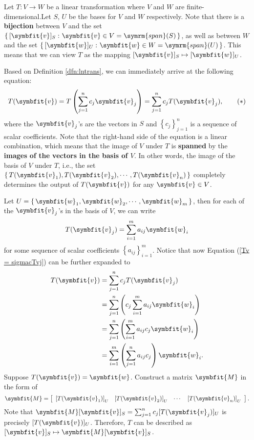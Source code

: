 \documentclass[math]{amznotes}
\theoremstyle{remark}
\begin{document}
Let $T \colon V \rightarrow W$ be a linear transformation where $V$ and $W$ are finite-dimensional.Let $S$, $U$ be the bases for $V$ and $W$ respectively. Note that there is a {\color{red} \textbf{bijection}} between $V$ and the set $\left\{ \, [\symbfit{v}]_S \,\colon \symbfit{v} \in V = \symrm{span}(S) \, \right\}$, as well as between $W$ and the set $\left\{ \, [\symbfit{w}]_U \,\colon \symbfit{w} \in W = \symrm{span}(U) \, \right\}$. This means that we can view $T$ as the mapping $[\symbfit{v}]_S \mapsto [\symbfit{w}]_U$. 

Based on Definition \ref{dfn:lntrans}, we can immediately arrive at the following equation:
\begin{displaymath}
    T(\symbfit{v}) = T\left(\sum_{j = 1}^{n}c_j \symbfit{v}_j\right) = \sum_{j = 1}^{n}c_jT(\symbfit{v}_j), \label{Tv = sigmacTvj} \tag{$*$}
\end{displaymath}
where the $\symbfit{v}_j$'s are the vectors in $S$ and $\left\{ c_j \right\}_{j = 1}^n$ is a sequence of scalar coefficients. Note that the right-hand side of the equation is a linear combination, which means that the image of $V$ under $T$ is {\color{red} \textbf{spanned}} by the {\color{red} \textbf{images of the vectors in the basis of $V$}}. In other words, the image of the basis of $V$ under $T$, i.e., the set $\left\{\, T(\symbfit{v}_1), T(\symbfit{v}_2), \cdots, T(\symbfit{v}_n) \,\right\}$ completely determines the output of $T(\symbfit{v})$ for any $\symbfit{v} \in V$.

Let $U = \left\{ \, \symbfit{w}_1, \symbfit{w}_2, \cdots, \symbfit{w}_m \, \right\}$, then for each of the $\symbfit{v}_j$'s in the basis of $V$, we can write
\begin{equation*}
    T(\symbfit{v}_j) = \sum_{i = 1}^{m}a_{ij} \symbfit{w}_i
\end{equation*}
for some sequence of scalar coefficients $\left\{a_{ij}\right\}_{i = 1}^m$. Notice that now Equation (\ref{Tv = sigmacTvj}) can be further expanded to
\begin{align*}
    T(\symbfit{v}) & = \sum_{j = 1}^{n}c_jT(\symbfit{v}_j) \\
                   & = \sum_{j = 1}^{n}\left(c_j\sum_{i = 1}^{m}a_{ij} \symbfit{w}_i\right) \\
                   & = \sum_{j = 1}^{n}\left(\sum_{i = 1}^{m}a_{ij}c_j \symbfit{w}_i\right) \\
                   & = \sum_{i = 1}^{m}\left(\sum_{j = 1}^{n}a_{ij}c_j\right)\symbfit{w}_i. \\
\end{align*}
Suppose $T(\symbfit{v}) = \symbfit{w}$. Construct a matrix $\symbfit{M}$ in the form of
\begin{displaymath}
    \symbfit{M} = \left[\begin{array}{cccc}
        \left[T(\symbfit{v}_1)\right]_U & \left[T(\symbfit{v}_2)\right]_U & \cdots & \left[T(\symbfit{v}_n)\right]_U
    \end{array}\right].
\end{displaymath}
Note that $\symbfit{M} [\symbfit{v}]_S = \sum_{j = 1}^{n} c_j[T(\symbfit{v}_j)]_U$ is precisely $[T(\symbfit{v})]_U$. Therefore, $T$ can be described as $[\symbfit{v}]_S \mapsto \symbfit{M}[\symbfit{v}]_S$.
\end{document}
